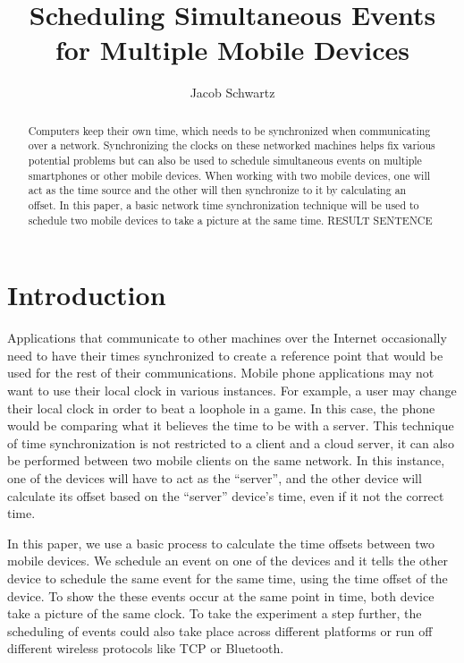 \documentclass[10pt]{IEEEtran}
\begin{document}
\title{Scheduling Simultaneous Events for Multiple Mobile Devices}
\author{Jacob Schwartz}
\maketitle

\begin{abstract}
Computers keep their own time, which needs to be synchronized when communicating
over a network. Synchronizing the clocks on these networked machines helps fix
various potential problems but can also be used to schedule simultaneous events
on multiple smartphones or other mobile devices.  When working with two mobile
devices, one will act as the time source and the other will then synchronize to
it by calculating an offset. In this paper, a basic network time synchronization
technique will be used to schedule two mobile devices to take a picture at the
same time. RESULT SENTENCE
\end{abstract}

\section{Introduction}

Applications that communicate to other machines over the Internet occasionally
need to have their times synchronized to create a reference point that would be
used for the rest of their communications.  Mobile phone applications may not
want to use their local clock in various instances. For example, a user may
change their local clock in order to beat a loophole in a game. In this case,
the phone would be comparing what it believes the time to be with a server. This
technique of time synchronization is not restricted to a client and a cloud
server, it can also be performed between two mobile clients on the same network.
In this instance, one of the devices will have to act as the ``server'', and the
other device will calculate its offset based on the ``server'' device's time,
even if it not the correct time.

In this paper, we use a basic process to calculate the time offsets between two
mobile devices. We schedule an event on one of the devices and it tells the
other device to schedule the same event for the same time, using the time offset
of the device. To show the these events occur at the same point in time, both
device take a picture of the same clock. To take the experiment a step further,
the scheduling of events could also take place across different platforms or run
off different wireless protocols like TCP or Bluetooth.
\end{document}
